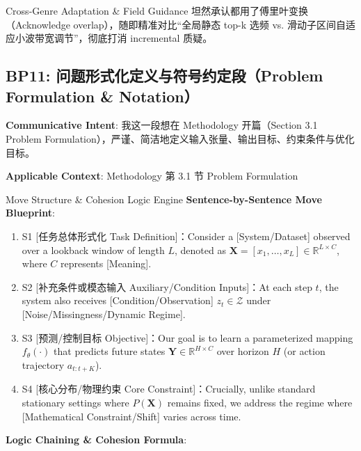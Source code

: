\endgroup
\vspace{4pt}
\begin{TipBox}{Cross-Genre Adaptation \& Field Guidance}
坦然承认都用了傅里叶变换（Acknowledge overlap），随即精准对比“全局静态 top-k 选频 vs. 滑动子区间自适应小波带宽调节”，彻底打消 incremental 质疑。
\end{TipBox}
\vspace{8pt}
\subsection{BP11: 问题形式化定义与符号约定段（Problem Formulation \& Notation）}\label{sec:bp:BP11}
\noindent\textbf{\color{AcadNavy}Communicative Intent}: 我这一段想在 Methodology 开篇（Section 3.1 Problem Formulation），严谨、简洁地定义输入张量、输出目标、约束条件与优化目标。\par\vspace{2pt}
\noindent\textbf{\color{AcadSlate}Applicable Context}: Methodology 第 3.1 节 Problem Formulation\par\vspace{4pt}
\begin{ConceptBox}{Move Structure \& Cohesion Logic Engine}
\textbf{Sentence-by-Sentence Move Blueprint}:
\begin{enumerate}[label=\textbf{\color{AcadNavy}S\arabic*.}, leftmargin=2em, itemsep=2pt]
  \item S1 [任务总体形式化 Task Definition]：Consider a [System/Dataset] observed over a lookback window of length $L$, denoted as $\mathbf{X} = [x_1, \dots, x_L] \in \mathbb{R}^{L \times C}$, where $C$ represents [Meaning].
  \item S2 [补充条件或模态输入 Auxiliary/Condition Inputs]：At each step $t$, the system also receives [Condition/Observation] $z_t \in \mathcal{Z}$ under [Noise/Missingness/Dynamic Regime].
  \item S3 [预测/控制目标 Objective]：Our goal is to learn a parameterized mapping $f_\theta(\cdot)$ that predicts future states $\hat{\mathbf{Y}} \in \mathbb{R}^{H \times C}$ over horizon $H$ (or action trajectory $a_{t:t+K}$).
  \item S4 [核心分布/物理约束 Core Constraint]：Crucially, unlike standard stationary settings where $P(\mathbf{X})$ remains fixed, we address the regime where [Mathematical Constraint/Shift] varies across time.
\end{enumerate}\par\vspace{4pt}
\textbf{Logic Chaining \& Cohesion Formula}:\par{}
\end{ConceptBox}
